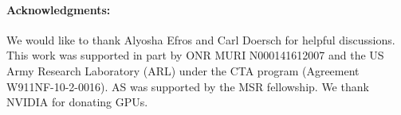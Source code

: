 \documentclass[10pt,twocolumn,letterpaper]{article}
\begin{document}
{\small
\paragraph{Acknowledgments:} We would like to thank Alyosha Efros and Carl Doersch for helpful discussions. This work was supported in part by ONR MURI N000141612007 and the US Army Research Laboratory (ARL) under the CTA program (Agreement W911NF-10-2-0016). AS was supported by the MSR fellowship. We thank NVIDIA for donating GPUs.}

\pagebreak
{\small


}
\end{document}
